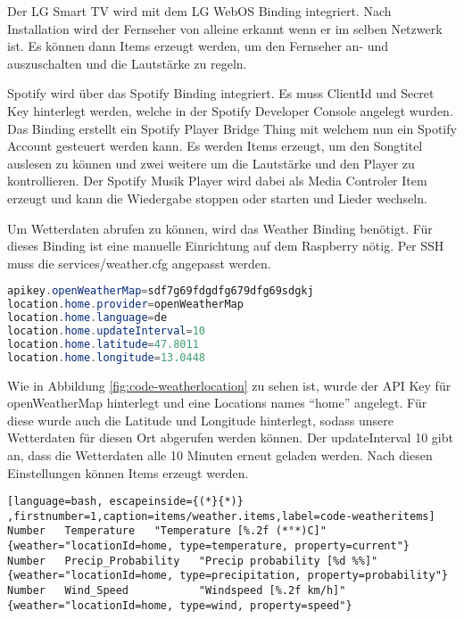 		Der LG Smart TV wird mit dem LG WebOS Binding integriert. Nach Installation wird der Fernseher von alleine erkannt wenn er im selben Netzwerk ist. Es können dann Items erzeugt werden, um den Fernseher an- und auszuschalten und die Lautstärke zu regeln.
		
		Spotify wird über das Spotify Binding integriert. Es muss ClientId und Secret Key hinterlegt werden, welche in der Spotify Developer Console angelegt wurden. Das Binding erstellt ein Spotify Player Bridge Thing mit welchem nun ein Spotify Account gesteuert werden kann. Es werden Items erzeugt, um den Songtitel auslesen zu können und zwei weitere um die Lautstärke und den Player zu kontrollieren. Der Spotify Musik Player wird dabei als Media Controler Item erzeugt und kann die Wiedergabe stoppen oder starten und Lieder wechseln.
		
		Um Wetterdaten abrufen zu können, wird das Weather Binding benötigt. Für dieses Binding ist eine manuelle Einrichtung auf dem Raspberry nötig. Per SSH muss die services/weather.cfg angepasst werden.
		
		\begin{lstlisting}[language=java,firstnumber=1,caption=services/weather.cfg,label=code-weatherlocation]
apikey.openWeatherMap=sdf7g69fdgdfg679dfg69sdgkj
location.home.provider=openWeatherMap
location.home.language=de
location.home.updateInterval=10
location.home.latitude=47.8011
location.home.longitude=13.0448
		\end{lstlisting}
		
		Wie in Abbildung \ref{fig:code-weatherlocation} zu sehen ist, wurde der API Key für openWeatherMap hinterlegt und eine Locations names "`home"' angelegt. Für diese wurde auch die Latitude und Longitude hinterlegt, sodass unsere Wetterdaten für diesen Ort abgerufen werden können. Der updateInterval 10 gibt an, dass die Wetterdaten alle 10 Minuten erneut geladen werden.
		Nach diesen Einstellungen können Items erzeugt werden.
		
				\begin{lstlisting}[language=bash, escapeinside={(*}{*)} ,firstnumber=1,caption=items/weather.items,label=code-weatheritems]
Number   Temperature   "Temperature [%.2f (*°*)C]"
{weather="locationId=home, type=temperature, property=current"}
Number   Precip_Probability   "Precip probability [%d %%]"
{weather="locationId=home, type=precipitation, property=probability"}
Number   Wind_Speed           "Windspeed [%.2f km/h]"
{weather="locationId=home, type=wind, property=speed"}
		\end{lstlisting}
		
